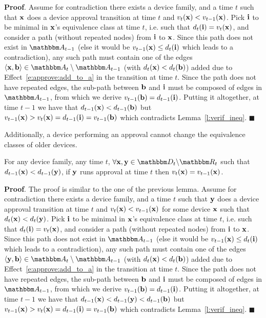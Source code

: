  \textbf{Proof}.
 Assume for contradiction there exists a device family, and a time $t$ such that $\mathbf{x}$ does a
 device approval transition at time $t$ and $v_{t}(\mathbf{x}) < v_{t-1}(\mathbf{x})$. Pick $\mathbf{i}$ to
 be minimal in $\mathbf{x}$'s equivalence class at time $t$, i.e. such that $d_{t}(\mathbf{i}) =
 v_{t}(\mathbf{x})$, and consider a path (without repeated nodes) from $\mathbf{i}$ to $\mathbf{x}$. Since
 this path does not exist in $\zset{A}_{t-1}$ (else it would be $v_{t-1}(\mathbf{x}) \leq
 d_{t}(\mathbf{i})$ which leads to a contradiction), any such path must contain one of the edges
 $\langle \zdev{x}, \zdev{b} \rangle \in \zset{A}_t \setminus \zset{A}_{t-1}$ (with $d_{t}(\mathbf{x})
 < d_{t}(\mathbf{b})$) added due to Effect~\ref{e:approve:add_to_a} in the transition at time $t$.
 Since the path does not have repeated edges, the sub-path between $\mathbf{b}$ and $\mathbf{i}$ must be
 composed of edges in $\zset{A}_{t-1}$, from which we derive $v_{t-1}(\mathbf{b}) = d_{t-1}(\mathbf{i})$.
 Putting it altogether, at time $t-1$ we have that $d_{t-1}(\mathbf{x})< d_{t-1}(\mathbf{b})$ but
 $v_{t-1}(\mathbf{x}) >  v_{t}(\mathbf{x}) = d_{t-1}(\mathbf{i}) = v_{t-1}(\mathbf{b})$ which contradicts
 Lemma~\ref{l:verif_ineq}. $\blacksquare$

Additionally, a device performing an approval cannot change the equivalence classes of older devices.

\begin{lemma}
  For any device family, any time $t$, $\forall \zdev{x}, \zdev{y} \in \zactive{t}$ such that
  $d_{t-1}(\mathbf{x}) < d_{t-1}(\mathbf{y})$, if $\mathbf{y}$ runs approval
  at time $t$ then $v_{t}(\mathbf{x}) = v_{t-1}(\mathbf{x})$.
  \label{l:olders}
\end{lemma}

\textbf{Proof}.
%
The proof is similar to the one of the previous lemma. Assume for contradiction there exists a
device family, and a time $t$ such that $\mathbf{y}$ does a device approval transition at time $t$ and
$v_{t}(\mathbf{x}) < v_{t-1}(\mathbf{x})$ for some device $\mathbf{x}$ such that $d_{t}(\mathbf{x}) <
d_{t}(\mathbf{y})$. Pick $\mathbf{i}$ to be minimal in $\mathbf{x}$'s equivalence class at time $t$, i.e.
such that $d_{t}(\mathbf{i}) = v_{t}(\mathbf{x})$, and consider a path (without repeated nodes) from
$\mathbf{i}$ to $\mathbf{x}$. Since this path does not exist in $\zset{A}_{t-1}$ (else it would be
$v_{t-1}(\mathbf{x}) \leq d_{t}(\mathbf{i})$ which leads to a contradiction), any such path must contain
one of the edges $\langle \zdev{y}, \zdev{b} \rangle \in \zset{A}_t \setminus \zset{A}_{t-1}$ (with
$d_{t}(\mathbf{x}) < d_{t}(\mathbf{b})$) added due to Effect~\ref{e:approve:add_to_a} in the
transition at time $t$. Since the path does not have repeated edges, the sub-path between $\mathbf{b}$
and $\mathbf{i}$ must be composed of edges in $\zset{A}_{t-1}$, from which we derive $v_{t-1}(\mathbf{b})
= d_{t-1}(\mathbf{i})$. Putting it altogether, at time $t-1$ we have that
$d_{t-1}(\mathbf{x})<d_{t-1}(\mathbf{y})<d_{t-1}(\mathbf{b})$ but $v_{t-1}(\mathbf{x}) > v_{t}(\mathbf{x}) =
d_{t-1}(\mathbf{i}) = v_{t-1}(\mathbf{b})$ which contradicts Lemma~\ref{l:verif_ineq}. $\blacksquare$

